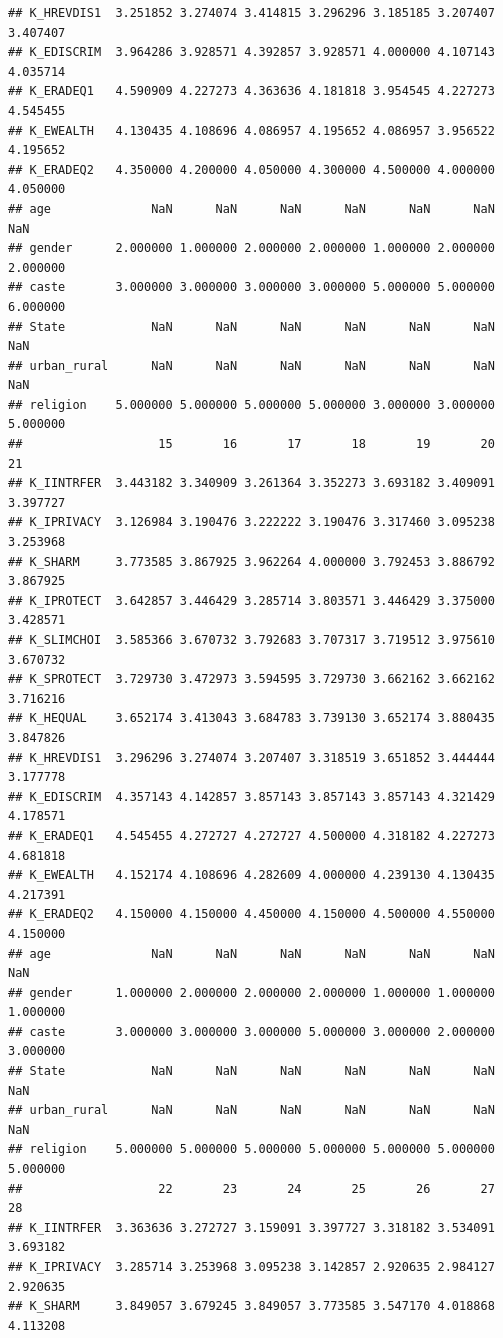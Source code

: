 \documentclass[
]{article}
\begin{document}
\begin{verbatim}
## K_HREVDIS1  3.251852 3.274074 3.414815 3.296296 3.185185 3.207407 3.407407
## K_EDISCRIM  3.964286 3.928571 4.392857 3.928571 4.000000 4.107143 4.035714
## K_ERADEQ1   4.590909 4.227273 4.363636 4.181818 3.954545 4.227273 4.545455
## K_EWEALTH   4.130435 4.108696 4.086957 4.195652 4.086957 3.956522 4.195652
## K_ERADEQ2   4.350000 4.200000 4.050000 4.300000 4.500000 4.000000 4.050000
## age              NaN      NaN      NaN      NaN      NaN      NaN      NaN
## gender      2.000000 1.000000 2.000000 2.000000 1.000000 2.000000 2.000000
## caste       3.000000 3.000000 3.000000 3.000000 5.000000 5.000000 6.000000
## State            NaN      NaN      NaN      NaN      NaN      NaN      NaN
## urban_rural      NaN      NaN      NaN      NaN      NaN      NaN      NaN
## religion    5.000000 5.000000 5.000000 5.000000 3.000000 3.000000 5.000000
##                   15       16       17       18       19       20       21
## K_IINTRFER  3.443182 3.340909 3.261364 3.352273 3.693182 3.409091 3.397727
## K_IPRIVACY  3.126984 3.190476 3.222222 3.190476 3.317460 3.095238 3.253968
## K_SHARM     3.773585 3.867925 3.962264 4.000000 3.792453 3.886792 3.867925
## K_IPROTECT  3.642857 3.446429 3.285714 3.803571 3.446429 3.375000 3.428571
## K_SLIMCHOI  3.585366 3.670732 3.792683 3.707317 3.719512 3.975610 3.670732
## K_SPROTECT  3.729730 3.472973 3.594595 3.729730 3.662162 3.662162 3.716216
## K_HEQUAL    3.652174 3.413043 3.684783 3.739130 3.652174 3.880435 3.847826
## K_HREVDIS1  3.296296 3.274074 3.207407 3.318519 3.651852 3.444444 3.177778
## K_EDISCRIM  4.357143 4.142857 3.857143 3.857143 3.857143 4.321429 4.178571
## K_ERADEQ1   4.545455 4.272727 4.272727 4.500000 4.318182 4.227273 4.681818
## K_EWEALTH   4.152174 4.108696 4.282609 4.000000 4.239130 4.130435 4.217391
## K_ERADEQ2   4.150000 4.150000 4.450000 4.150000 4.500000 4.550000 4.150000
## age              NaN      NaN      NaN      NaN      NaN      NaN      NaN
## gender      1.000000 2.000000 2.000000 2.000000 1.000000 1.000000 1.000000
## caste       3.000000 3.000000 3.000000 5.000000 3.000000 2.000000 3.000000
## State            NaN      NaN      NaN      NaN      NaN      NaN      NaN
## urban_rural      NaN      NaN      NaN      NaN      NaN      NaN      NaN
## religion    5.000000 5.000000 5.000000 5.000000 5.000000 5.000000 5.000000
##                   22       23       24       25       26       27       28
## K_IINTRFER  3.363636 3.272727 3.159091 3.397727 3.318182 3.534091 3.693182
## K_IPRIVACY  3.285714 3.253968 3.095238 3.142857 2.920635 2.984127 2.920635
## K_SHARM     3.849057 3.679245 3.849057 3.773585 3.547170 4.018868 4.113208

\end{verbatim}
\end{document}
